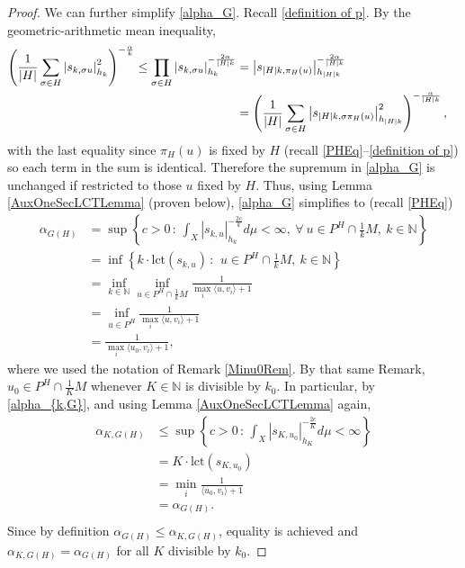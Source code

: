 \documentclass{article}
\newcommand{\lct}{\mathrm{lct}}
\newcommand{\NN}{{\mathbb N}}
\renewcommand{\>}{\rightarrow}
\theoremstyle{plain}
\theoremstyle{definition}
\newcommand{\bpf}{\begin{proof}}
\newcommand{\epf}{\end{proof}}
\begin{document}
\bpf
    We can further simplify \eqref{alpha_G}. 
    Recall \eqref{definition of p}.
    By the geometric-arithmetic mean inequality,
    \begin{align*}
        \left(\frac{1}{|H|}\sum_{\sigma\in H}\left|s_{k,\sigma u}\right|_{h_k}^2\right)^{-\frac{\alpha}{k}}\leq\prod_{\sigma\in H}\left|s_{k,\sigma u}\right|_{h_k}^{-\frac{2\alpha}{|H|k}}
        &=\left|s_{|H|k,\pi_H(u)
        }\right|_{h_{|H|k}}^{-\frac{2\alpha}{|H|k}}
        \cr
        &=\left(\frac{1}{|H|}\sum_{\sigma\in H}\left|s_{|H|k,\sigma\pi_H(u)
        }\right|_{h_{|H|k}}^2\right)^{-\frac{\alpha}{|H|k}},
    \end{align*} 
    with the last equality since $\pi_H(u)$ is fixed by $H$
    (recall \eqref{PHEq}--\eqref{definition of p})
    so each term in the sum is identical.
    Therefore the supremum in \eqref{alpha_G} is unchanged 
    if restricted to those $u$ fixed by $H$. Thus, using
    Lemma \ref{AuxOneSecLCTLemma} (proven below), \eqref{alpha_G} simplifies to
    (recall \eqref{PHEq})
    \begin{align*}
        \alpha_{G(H)}
        &=
        \sup\left\{c>0\,:\,\int_X\left|s_{k,u}\right|_{h_k}^{-\frac{2c}{k}}d\mu<\infty,~\forall~u\in P^H\cap\frac{1}{k}M,~k\in\NN\right\}
        \\
        &=
        \inf\left\{k\cdot\lct(s_{k,u})\,:\,~u\in P^H\cap\frac{1}{k}M,~k\in\NN\right\}
        \\
        &=\inf_{k\in\NN}\inf_{u\in P^H\cap\frac{1}{k}M}\frac{1}{
        \max_i\langle u,v_i\rangle+1}\\
        &=\inf_{u\in P^H}\frac{1}{\max_i\langle u,v_i\rangle+1}\\
        &=\frac1{\max_i\langle u_0,v_i\rangle+1},
    \end{align*}
    where we used the notation of Remark \ref{Minu0Rem}. By that same Remark,
    $u_0\in P^H\cap\frac{1}{K}M$ whenever $K\in\NN$ is divisible by $k_0$. In particular, by \eqref{alpha_{k,G}}, and using Lemma \ref{AuxOneSecLCTLemma} again,
    \begin{align*}
        \alpha_{K,G(H)}&\leq\sup\left\{c>0\,:\,\int_X\left|s_{K,u_0}\right|_{h_K}^{-\frac{2c}{K}}d\mu<\infty\right\}\\
        &=K\cdot\lct(s_{K,u_0})\\
        &=\min_i\frac{1}{\langle u_0,v_i\rangle+1}\\
        &=\alpha_{G(H)}.\\
\end{align*}
Since by definition $\alpha_{G(H)}\le \alpha_{K,G(H)}$, 
    equality is achieved and $\alpha_{K,G(H)}=\alpha_{G(H)}$ for all $K$ divisible by $k_0$. \epf
\end{document}
